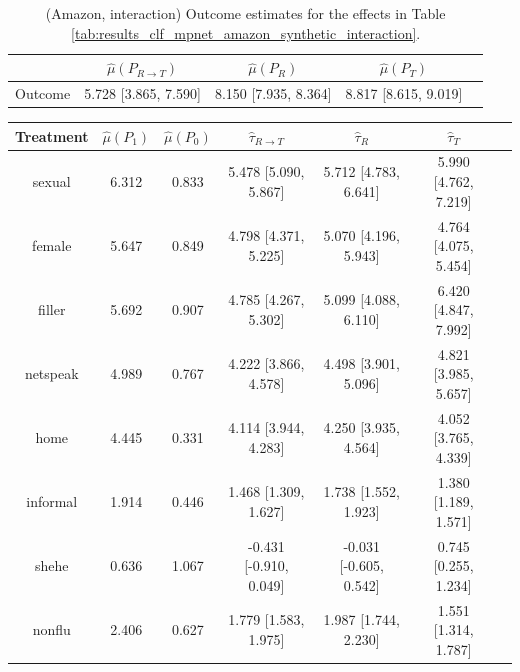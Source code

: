 \documentclass{article}
\begin{document}
\begin{table}[]
    \centering
    \begin{tabular}{c|cccc}
\toprule
    & $\hat{\mu}(P_{R \rightarrow T})$   & $\hat{\mu}(P_R)$     & $\hat{\mu}(P_T)$     \\
\midrule
    Outcome & 5.728 [3.865, 7.590]               & 8.150 [7.935, 8.364] & 8.817 [8.615, 9.019] \\
\bottomrule
    \end{tabular}
    \caption{(Amazon, interaction) Outcome estimates for the effects in Table \ref{tab:results_clf_mpnet_amazon_synthetic_interaction}.}
    \label{tab:results_clf_mpnet_amazon_synthetic_interaction_outcome}
\end{table}

\begin{table}[!ht]
\centering
\begin{tabular}{c|cccccc}
\toprule
    Treatment   &   $\hat{\mu}(P_1)$ &   $\hat{\mu}(P_0)$ & $\hat{\tau}_{R \rightarrow T}$   & $\hat{\tau}_R$          & $\hat{\tau}_T$          \\
\midrule
    sexual      &              6.312 &              0.833 & 5.478 [5.090, 5.867]             & 5.712 [4.783, 6.641]    & 5.990 [4.762, 7.219]    \\
    female      &              5.647 &              0.849 & 4.798 [4.371, 5.225]             & 5.070 [4.196, 5.943]    & 4.764 [4.075, 5.454]    \\
    filler      &              5.692 &              0.907 & 4.785 [4.267, 5.302]             & 5.099 [4.088, 6.110]    & 6.420 [4.847, 7.992]    \\
    netspeak    &              4.989 &              0.767 & 4.222 [3.866, 4.578]             & 4.498 [3.901, 5.096]    & 4.821 [3.985, 5.657]    \\
    home        &              4.445 &              0.331 & 4.114 [3.944, 4.283]             & 4.250 [3.935, 4.564]    & 4.052 [3.765, 4.339]    \\
    informal    &              1.914 &              0.446 & 1.468 [1.309, 1.627]             & 1.738 [1.552, 1.923]    & 1.380 [1.189, 1.571]    \\
    shehe       &              0.636 &              1.067 & -0.431 [-0.910, 0.049]           & -0.031 [-0.605, 0.542]  & 0.745 [0.255, 1.234]    \\
    nonflu      &              2.406 &              0.627 & 1.779 [1.583, 1.975]             & 1.987 [1.744, 2.230]    & 1.551 [1.314, 1.787]    \\

\end{tabular}
\end{table}
\end{document}

